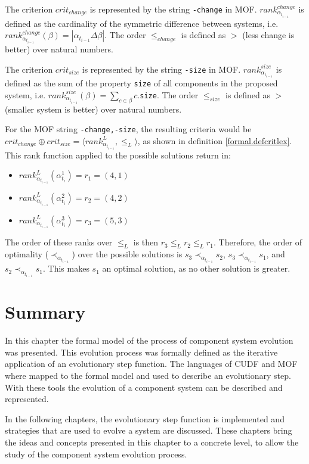 The criterion $crit_{change}$ is represented by the string \verb+-change+ in MOF.
$rank^{change}_{\alpha_{t_{i-1}}}$ is defined as the cardinality of the symmetric difference between systems, i.e. $rank^{change}_{\alpha_{t_{i-1}}}(\beta) = |\alpha_{t_{i-1}} \Delta \beta|$.
The order $\leq_{change}$ is defined as $>$ (less change is better) over natural numbers. 

The criterion $crit_{size}$ is represented by the string \verb+-size+ in MOF.
$rank^{size}_{\alpha_{t_{i-1}}}$ is defined as the sum of the property \verb+size+ of all components in the  proposed system, i.e. $rank^{size}_{\alpha_{t_{i-1}}}(\beta) = \sum_{c \in \beta} c$.\verb+size+.
The order $\leq_{size}$ is defined as $>$ (smaller system is better) over natural numbers. 

For the MOF string \verb+-change,-size+, the resulting criteria would be $crit_{change} \oplus crit_{size} = \langle rank^{L}_{\alpha_{t_{i-1}}}, \leq_L \rangle$, as shown in definition \ref{formal.defcritlex}.
This rank function applied to the possible solutions return in:
\begin{itemize}
  \item $rank^{L}_{\alpha_{t_{i-1}}}(\alpha_{t_i}^1 ) = r_1 = (4, 1)$
  \item $rank^{L}_{\alpha_{t_{i-1}}}(\alpha_{t_i}^2 ) = r_2 = (4, 2)$
  \item $rank^{L}_{\alpha_{t_{i-1}}}(\alpha_{t_i}^3 ) = r_3 = (5, 3)$
\end{itemize}
The order of these ranks over $\leq_L$ is then $r_3 \leq_L r_2 \leq_L r_1$.
Therefore, the order of optimality ($\prec_{\alpha_{t_{i-1}}}$) over the possible solutions is $s_3 \prec_{\alpha_{t_{i-1}}} s_2$, $s_3 \prec_{\alpha_{t_{i-1}}} s_1$, and $s_2 \prec_{\alpha_{t_{i-1}}} s_1$.
This makes $s_1$ an optimal solution, as no other solution is greater. 

\section{Summary}
In this chapter the formal model of the process of component system evolution was presented.
This evolution process was formally defined as the iterative application of an evolutionary step function.
The languages of CUDF and MOF where mapped to the formal model and used to describe an evolutionary step.
With these tools the evolution of a component system can be described and represented.

In the following chapters, the evolutionary step function is implemented and strategies that are used to evolve a system are discussed.
These chapters bring the ideas and concepts presented in this chapter to a concrete level, to allow the study of the component system evolution process.